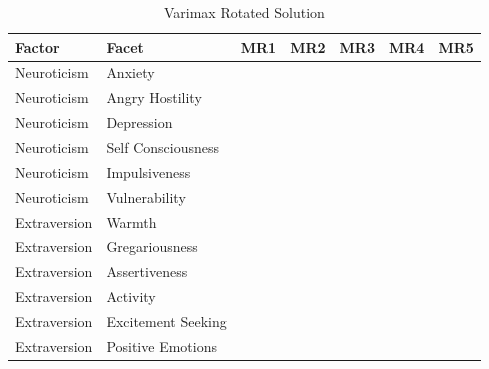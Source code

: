 \documentclass{article}\usepackage[]{graphicx}\usepackage[]{color}
\begin{document}
\begin{table}
\caption{\label{tab:unnamed-chunk-15}Varimax Rotated Solution}
\centering
\begin{tabular}[t]{lllllll}
\toprule
Factor & Facet & MR1 & MR2 & MR3 & MR4 & MR5\\
\midrule
Neuroticism & Anxiety & \cellcolor{white}{-0.09} & \cellcolor{white}{0.12} & \cellcolor{yellow}{0.84} & \cellcolor{white}{0.04} & \cellcolor{white}{0.06}\\
Neuroticism & Angry Hostility & \cellcolor{white}{0.05} & \cellcolor{white}{-0.02} & \cellcolor{yellow}{0.53} & \cellcolor{yellow}{-0.66} & \cellcolor{white}{-0.1}\\
Neuroticism & Depression & \cellcolor{white}{-0.13} & \cellcolor{white}{-0.18} & \cellcolor{yellow}{0.84} & \cellcolor{white}{-0.03} & \cellcolor{white}{0.04}\\
Neuroticism & Self Consciousness & \cellcolor{white}{-0.27} & \cellcolor{white}{0.07} & \cellcolor{yellow}{0.71} & \cellcolor{white}{0.11} & \cellcolor{white}{-0.02}\\
Neuroticism & Impulsiveness & \cellcolor{white}{0.3} & \cellcolor{white}{-0.27} & \cellcolor{white}{0.42} & \cellcolor{white}{-0.15} & \cellcolor{white}{0.02}\\
\addlinespace
Neuroticism & Vulnerability & \cellcolor{white}{-0.18} & \cellcolor{white}{-0.17} & \cellcolor{yellow}{0.78} & \cellcolor{white}{0.01} & \cellcolor{white}{-0.08}\\
Extraversion & Warmth & \cellcolor{yellow}{0.76} & \cellcolor{white}{0.06} & \cellcolor{white}{-0.06} & \cellcolor{white}{0.36} & \cellcolor{white}{0.03}\\
Extraversion & Gregariousness & \cellcolor{yellow}{0.69} & \cellcolor{white}{-0.02} & \cellcolor{white}{-0.13} & \cellcolor{white}{0.07} & \cellcolor{white}{-0.02}\\
Extraversion & Assertiveness & \cellcolor{yellow}{0.55} & \cellcolor{white}{0.26} & \cellcolor{white}{-0.32} & \cellcolor{white}{-0.21} & \cellcolor{white}{-0.05}\\
Extraversion & Activity & \cellcolor{yellow}{0.55} & \cellcolor{white}{0.36} & \cellcolor{white}{-0.1} & \cellcolor{white}{-0.19} & \cellcolor{white}{0.1}\\
\addlinespace
Extraversion & Excitement Seeking & \cellcolor{white}{0.4} & \cellcolor{white}{-0.15} & \cellcolor{white}{-0.15} & \cellcolor{white}{-0.11} & \cellcolor{white}{0.19}\\
Extraversion & Positive Emotions & \cellcolor{yellow}{0.64} & \cellcolor{white}{0.11} & \cellcolor{white}{-0.29} & \cellcolor{white}{0.24} & \cellcolor{white}{0.29}\\

\end{tabular}
\end{table}
\end{document}
